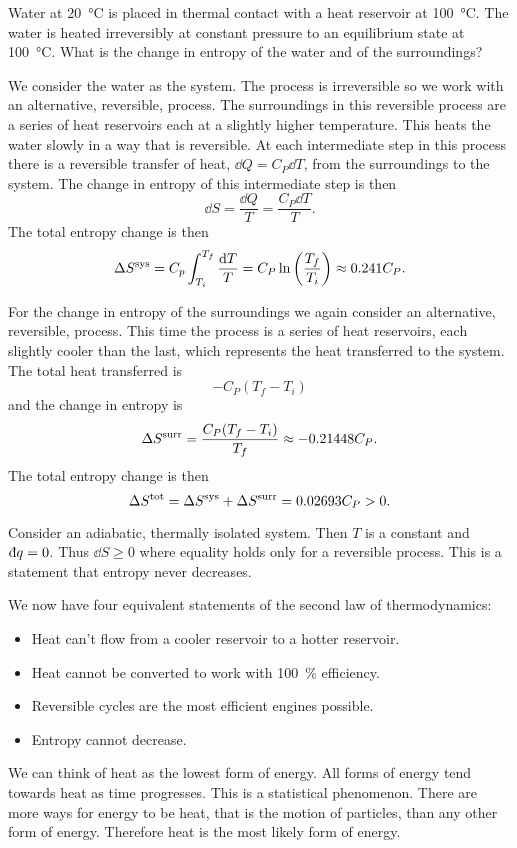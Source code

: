     \begin{example}\label{exa:heating water}
        Water at \SI{20}{\degreeCelsius} is placed in thermal contact with a heat reservoir at \SI{100}{\degreeCelsius}.
        The water is heated irreversibly at constant pressure to an equilibrium state at \SI{100}{\degreeCelsius}.
        What is the change in entropy of the water and of the surroundings?
        
        We consider the water as the system.
        The process is irreversible so we work with an alternative, reversible, process.
        The surroundings in this reversible process are a series of heat reservoirs each at a slightly higher temperature.
        This heats the water slowly in a way that is reversible.
        At each intermediate step in this process there is a reversible transfer of heat, \(\dd{Q} = C_P\dd{T}\), from the surroundings to the system.
        The change in entropy of this intermediate step is then
        \[\dd{S} = \frac{\dd{Q}}{T} = \frac{C_P\dd{T}}{T}.\]
        The total entropy change is then
        \[\Delta S^{\mathrm{sys}} = C_p\int_{T_i}^{T_f}\frac{\dd{T}}{T} = C_P\ln\left(\frac{T_f}{T_i}\right) \approx 0.241C_P.\]
        
        For the change in entropy of the surroundings we again consider an alternative, reversible, process.
        This time the process is a series of heat reservoirs, each slightly cooler than the last, which represents the heat transferred to the system.
        The total heat transferred is
        \[-C_P(T_f - T_i)\]
        and the change in entropy is
        \[\Delta S^{\mathrm{surr}} = \frac{C_P(T_f - T_i)}{T_f} \approx -0.21448C_P.\]
        The total entropy change is then
        \[\Delta S^{\mathrm{tot}} = \Delta S^{\mathrm{sys}} + \Delta S^{\mathrm{surr}} = 0.02693C_P > 0.\]
    \end{example}
    
    Consider an adiabatic, thermally isolated system.
    Then \(T\) is a constant and \(\ddbar{q} = 0\).
    Thus \(\dd{S} \ge 0\) where equality holds only for a reversible process.
    This is a statement that entropy never decreases.
    
    We now have four equivalent statements of the second law of thermodynamics:
    \begin{itemize}
        \item Heat can't flow from a cooler reservoir to a hotter reservoir.
        \item Heat cannot be converted to work with \SI{100}{\percent} efficiency.
        \item Reversible cycles are the most efficient engines possible.
        \item Entropy cannot decrease.
    \end{itemize}
    We can think of heat as the lowest form of energy.
    All forms of energy tend towards heat as time progresses.
    This is a statistical phenomenon.
    There are more ways for energy to be heat, that is the motion of particles, than any other form of energy.
    Therefore heat is the most likely form of energy.
    
